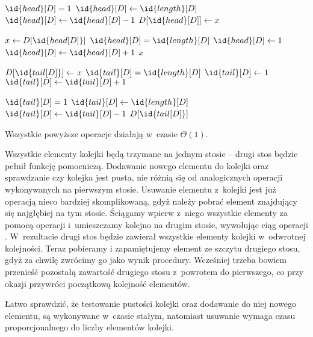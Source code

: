 \begin{codebox}
\li	\If $\id{head}[D]=1$
\li		\Then $\id{head}[D]\gets\id{length}[D]$
\li		\Else $\id{head}[D]\gets\id{head}[D]-1$
		\End
\li	$D[\id{head}[D]]\gets x$
\end{codebox}

\begin{codebox}
\li	$x\gets D[\id{head[D]}]$
\li	\If $\id{head}[D]=\id{length}[D]$
\li		\Then $\id{head}[D]\gets1$
\li		\Else $\id{head}[D]\gets\id{head}[D]+1$
		\End
\li	\Return $x$
\end{codebox}

\begin{codebox}
\li	$D[\id{tail[D]}]\gets x$
\li	\If $\id{tail}[D]=\id{length}[D]$
\li		\Then $\id{tail}[D]\gets1$
\li		\Else $\id{tail}[D]\gets\id{tail}[D]+1$
		\End
\end{codebox}

\begin{codebox}
\li	\If $\id{tail}[D]=1$
\li		\Then $\id{tail}[D]\gets\id{length}[D]$
\li		\Else $\id{tail}[D]\gets\id{tail}[D]-1$
		\End
\li	\Return $D[\id{tail[D]}]$
\end{codebox}

Wszystkie powyższe operacje działają w~czasie $\Theta(1)$.

\exercise %
Wszystkie elementy kolejki będą trzymane na jednym stosie -- drugi stos będzie pełnił funkcję pomocniczą. Dodawanie nowego elementu do kolejki oraz sprawdzanie czy kolejka jest pusta, nie różnią się od analogicznych operacji wykonywanych na pierwszym stosie. Usuwanie elementu z~kolejki jest już operacją nieco bardziej skomplikowaną, gdyż należy pobrać element znajdujący się najgłębiej na tym stosie. Ściągamy wpierw z~niego wszystkie elementy za pomocą operacji  i~umieszczamy kolejno na drugim stosie, wywołując ciąg operacji . W~rezultacie drugi stos będzie zawierał wszystkie elementy kolejki w~odwrotnej kolejności. Teraz pobieramy i zapamiętujemy element ze szczytu drugiego stosu, gdyż za chwilę zwrócimy go jako wynik procedury. Wcześniej trzeba bowiem przenieść pozostałą zawartość drugiego stosu z~powrotem do pierwszego, co przy okazji przywróci początkową kolejność elementów.

Łatwo sprawdzić, że testowanie pustości kolejki oraz dodawanie do niej nowego elementu, są wykonywane w~czasie stałym, natomiast usuwanie wymaga czasu proporcjonalnego do liczby elementów kolejki.

